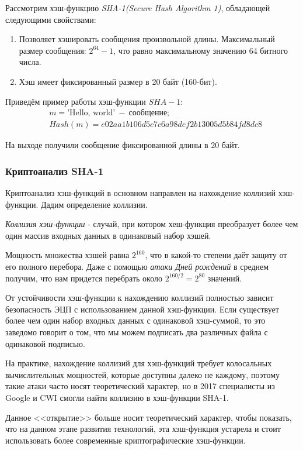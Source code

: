 Рассмотрим хэш-функцию \emph{SHA-1(Secure Hash Algorithm 1)}, обладающей следующими свойствами:
\begin{enumerate}
	\item Позволяет хэшировать сообщения произвольной длины. Максимальный размер сообщения: $2^{64} - 1$, что равно максимальному значению 64 битного числа.
	\item Хэш имеет фиксированный размер в 20 байт (160-бит).
\end{enumerate}

Приведём пример работы хэш-функции $SHA-1$:
\begin{align*}
	& m = \text{'Hello, world'}\  - \  \text{сообщение}; \\
	& Hash(m) = e02aa1b106d5c7c6a98def2b13005d5b84fd8dc8
\end{align*}

На выходе получили сообщение фиксированной длины в 20 байт.

\subsubsection{Криптоанализ SHA-1}

Криптоанализ хэш-функций в основном направлен на нахождение коллизий хэш-функции. Дадим определение коллизии.

\emph{Коллизия хэш-функции} - случай, при котором хеш-функция преобразует более чем один массив входных данных в одинаковый набор хэшей. 

Мощность множества хэшей равна $2^{160}$, что в какой-то степени даёт защиту от его полного перебора.
Даже с помощью \emph{атаки Дней рождений} в среднем получим, что нам придется перебрать около $2^{160/2} = 2^{80}$ значений.

От устойчивости хэш-функции к нахождению коллизий полностью зависит безопасность ЭЦП с использованием данной хэш-функции.
Если существует более чем один набор входных данных с одинаковой хэш-суммой, то это заведомо говорит о том, что мы можем подписать два различных файла с
одинаковой подписью.

На практике, нахождение коллизий для хэш-функций требует колосальных вычислительных мощностей, которые доступны далеко не каждому, поэтому такие атаки часто носят теоретический характер,
но в 2017 специалисты из Google и CWI смогли найти коллизию в хэш-функции SHA-1.

Данное <<открытие>> больше носит теоретический характер, чтобы показать, что на данном этапе развития технологий, эта хэш-функция устарела и стоит использовать более современные криптографические хэш-функции.

